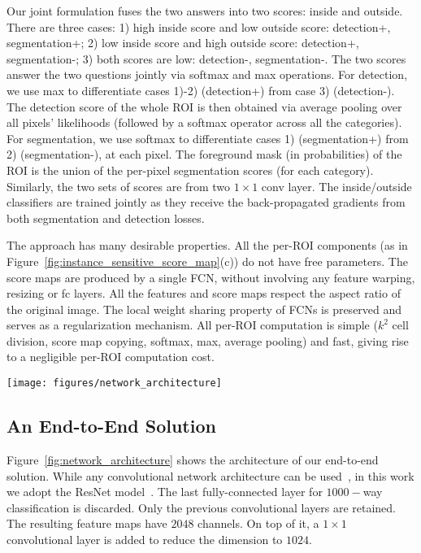 \documentclass[10pt,twocolumn,letterpaper]{article}
\begin{document}
Our joint formulation fuses the two answers into two scores: inside and outside. There are three cases: 1) high inside score and low outside score: detection+, segmentation+; 2) low inside score and high outside score: detection+, segmentation-; 3) both scores are low: detection-, segmentation-. The two scores answer the two questions jointly via softmax and max operations. For detection, we use max to differentiate cases 1)-2) (detection+) from case 3) (detection-). The detection score of the whole ROI is then obtained via average pooling over all pixels' likelihoods (followed by a softmax operator across all the categories). For segmentation, we use softmax to differentiate cases 1) (segmentation+) from 2) (segmentation-), at each pixel. The foreground mask (in probabilities) of the ROI is the union of the per-pixel segmentation scores (for each category). Similarly, the two sets of scores are from two $1\times 1$ conv layer. The inside/outside classifiers are trained jointly as they receive the back-propagated gradients from both segmentation and detection losses. 

The approach has many desirable properties. All the per-ROI components (as in Figure~\ref{fig:instance_sensitive_score_map}(c)) do not have free parameters. The score maps are produced by a single FCN, without involving any feature warping, resizing or fc layers. All the features and score maps respect the aspect ratio of the original image. The local weight sharing property of FCNs is preserved and serves as a regularization mechanism. All per-ROI computation is simple ($k^2$ cell division, score map copying, softmax, max, average pooling) and fast, giving rise to a negligible per-ROI computation cost.

\begin{figure*}
	\centering
	\texttt{[image: figures/network\_architecture]}
	\caption{Overall architecture of FCIS. A region proposal network (RPN)~\cite{ren2015faster} shares the convolutional feature maps with FCIS. The proposed region-of-interests (ROIs) are applied on the score maps for joint object segmentation and detection. The learnable weight layers are fully convolutional and computed on the whole image. The per-ROI computation cost is negligible.}
	\label{fig:network_architecture}
\end{figure*}

\subsection{An End-to-End Solution}
\label{sec.end_to_end}
Figure~\ref{fig:network_architecture} shows the architecture of our end-to-end solution. While any convolutional network architecture can be used~\cite{simonyan2015very,szegedy2015going}, in this work we adopt the ResNet model~\cite{he2016deep}. The last fully-connected layer for $1000-$way classification is discarded. Only the previous convolutional layers are retained. The resulting feature maps have $2048$ channels. On top of it, a $1\times 1$ convolutional layer is added to reduce the dimension to $1024$.
\end{document}
